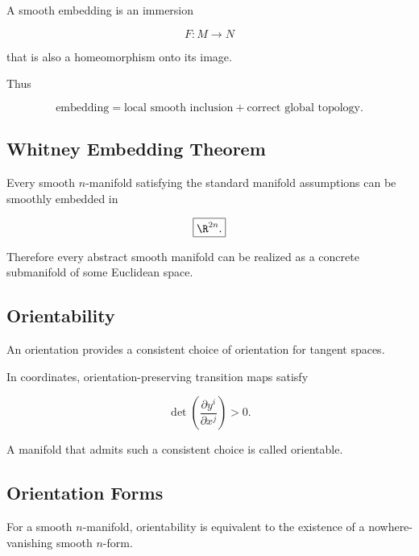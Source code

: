 A smooth embedding is an immersion

\[
F:M\to N
\]

that is also a homeomorphism onto its image.

Thus

\[
\boxed{
\text{embedding}
=
\text{local smooth inclusion}
+
\text{correct global topology}.
}
\]

\subsection{Whitney Embedding Theorem}
\label{subsec:manifold-whitney-embedding}

\begin{theorem}
Every smooth \(n\)-manifold satisfying the standard manifold assumptions can
be smoothly embedded in

\[
\boxed{
\R^{2n}.
}
\]
\end{theorem}

Therefore every abstract smooth manifold can be realized as a concrete
submanifold of some Euclidean space.

\subsection{Orientability}
\label{subsec:manifold-orientability}

An orientation provides a consistent choice of orientation for tangent
spaces.

In coordinates, orientation-preserving transition maps satisfy

\[
\boxed{
\det
\left(
\frac{\partial y^i}{\partial x^j}
\right)
>0.
}
\]

A manifold that admits such a consistent choice is called orientable.

\subsection{Orientation Forms}
\label{subsec:orientation-forms-manifolds}

For a smooth \(n\)-manifold, orientability is equivalent to the existence of
a nowhere-vanishing smooth \(n\)-form.

